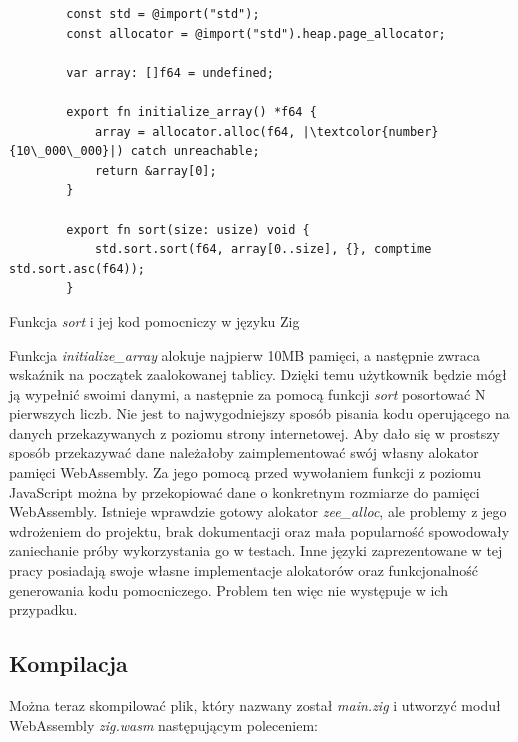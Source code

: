 \documentclass[language=polish,type=master]{aghmodern}
\begin{document}
\begin{listing}[H]
    \begin{verbatim}
        const std = @import("std");
        const allocator = @import("std").heap.page_allocator;

        var array: []f64 = undefined;

        export fn initialize_array() *f64 {
            array = allocator.alloc(f64, |\textcolor{number}{10\_000\_000}|) catch unreachable;
            return &array[0];
        }

        export fn sort(size: usize) void {
            std.sort.sort(f64, array[0..size], {}, comptime std.sort.asc(f64));
        }
    \end{verbatim}
    \caption{Funkcja \emph{sort} i jej kod pomocniczy w języku Zig}
\end{listing}

Funkcja \emph{initialize\_array} alokuje najpierw 10MB pamięci, a następnie zwraca wskaźnik na początek zaalokowanej tablicy.
Dzięki temu użytkownik będzie mógł ją wypełnić swoimi danymi, a następnie za pomocą funkcji \emph{sort} posortować N pierwszych liczb.
Nie jest to najwygodniejszy sposób pisania kodu operującego na danych przekazywanych z poziomu strony internetowej.
Aby dało się w prostszy sposób przekazywać dane należałoby zaimplementować swój własny alokator\footnotemark{} pamięci WebAssembly.
Za jego pomocą przed wywołaniem funkcji z poziomu JavaScript można by przekopiować dane o konkretnym rozmiarze do pamięci WebAssembly.
Istnieje wprawdzie gotowy alokator \emph{zee\_alloc}\footnotemark{}, ale problemy z jego wdrożeniem do projektu, brak dokumentacji oraz mała popularność spowodowały zaniechanie próby wykorzystania go w testach.
Inne języki zaprezentowane w tej pracy posiadają swoje własne implementacje alokatorów oraz funkcjonalność generowania kodu pomocniczego.
Problem ten więc nie występuje w ich przypadku.

\subsection{Kompilacja}
Można teraz skompilować plik, który nazwany został \emph{main.zig} i utworzyć moduł WebAssembly \emph{zig.wasm} następującym poleceniem:
\end{document}
